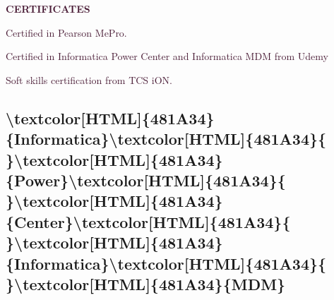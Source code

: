 \documentclass[12pt]{article}%
\begin{document}
%
\begin{center}%
\textcolor[HTML]{481A34}{\textbf{CERTIFICATES}}%
\end{center}%
\newline%
%
\begin{justify}%
\textcolor[HTML]{481A34}{Certified}\textcolor[HTML]{481A34}{ }\textcolor[HTML]{481A34}{in}\textcolor[HTML]{481A34}{ }\textcolor[HTML]{481A34}{Pearson}\textcolor[HTML]{481A34}{ }\textcolor[HTML]{481A34}{MePro.}%
\end{justify}%
\newline%
%
\begin{justify}%
\textcolor[HTML]{481A34}{Certified}\textcolor[HTML]{481A34}{ }\textcolor[HTML]{481A34}{in}\textcolor[HTML]{481A34}{ }\textcolor[HTML]{481A34}{Informatica}\textcolor[HTML]{481A34}{ }\textcolor[HTML]{481A34}{Power}\textcolor[HTML]{481A34}{ }\textcolor[HTML]{481A34}{Center}\textcolor[HTML]{481A34}{ }\textcolor[HTML]{481A34}{and}\textcolor[HTML]{481A34}{ }\textcolor[HTML]{481A34}{Informatica}\textcolor[HTML]{481A34}{ }\textcolor[HTML]{481A34}{MDM}\textcolor[HTML]{481A34}{ }\textcolor[HTML]{481A34}{from}\textcolor[HTML]{481A34}{ }\textcolor[HTML]{481A34}{Udemy}%
\end{justify}%
\newline%
%
\begin{justify}%
\textcolor[HTML]{481A34}{Soft}\textcolor[HTML]{481A34}{ }\textcolor[HTML]{481A34}{skills}\textcolor[HTML]{481A34}{ }\textcolor[HTML]{481A34}{certification}\textcolor[HTML]{481A34}{ }\textcolor[HTML]{481A34}{from}\textcolor[HTML]{481A34}{ }\textcolor[HTML]{481A34}{TCS}\textcolor[HTML]{481A34}{ }\textcolor[HTML]{481A34}{iON.}%
\end{justify}%
\newline%
%
\subsection{\textbackslash{}textcolor{[}HTML{]}\{481A34\}\{Informatica\}\textbackslash{}textcolor{[}HTML{]}\{481A34\}\{ \}\textbackslash{}textcolor{[}HTML{]}\{481A34\}\{Power\}\textbackslash{}textcolor{[}HTML{]}\{481A34\}\{ \}\textbackslash{}textcolor{[}HTML{]}\{481A34\}\{Center\}\textbackslash{}textcolor{[}HTML{]}\{481A34\}\{ \}\textbackslash{}textcolor{[}HTML{]}\{481A34\}\{Informatica\}\textbackslash{}textcolor{[}HTML{]}\{481A34\}\{ \}\textbackslash{}textcolor{[}HTML{]}\{481A34\}\{MDM\}}%
\label{subsec:subsec57}%
\end{document}
